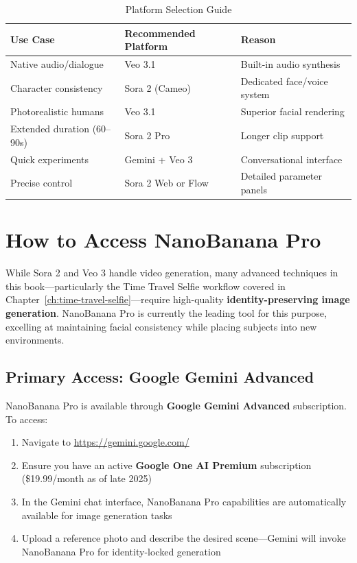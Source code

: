 \begin{table}[H]
\centering
\caption{Platform Selection Guide}
\label{tab:veo-sora-selection}
\begin{tabular}{p{4cm}p{5cm}p{5cm}}
\toprule
\textbf{Use Case} & \textbf{Recommended Platform} & \textbf{Reason} \\
\midrule
Native audio/dialogue & Veo 3.1 & Built-in audio synthesis \\
Character consistency & Sora 2 (Cameo) & Dedicated face/voice system \\
Photorealistic humans & Veo 3.1 & Superior facial rendering \\
Extended duration (60--90s) & Sora 2 Pro & Longer clip support \\
Quick experiments & Gemini + Veo 3 & Conversational interface \\
Precise control & Sora 2 Web or Flow & Detailed parameter panels \\
\bottomrule
\end{tabular}
\end{table}

\section{How to Access NanoBanana Pro}
\label{sec:accessing-nanobanana}

While Sora 2 and Veo 3 handle video generation, many advanced techniques in this book—particularly the Time Travel Selfie workflow covered in Chapter~\ref{ch:time-travel-selfie}—require high-quality \textbf{identity-preserving image generation}. NanoBanana Pro is currently the leading tool for this purpose, excelling at maintaining facial consistency while placing subjects into new environments.

\subsection{Primary Access: Google Gemini Advanced}

NanoBanana Pro is available through \textbf{Google Gemini Advanced} subscription. To access:

\begin{enumerate}
\item Navigate to \url{https://gemini.google.com/}
\item Ensure you have an active \textbf{Google One AI Premium} subscription (\$19.99/month as of late 2025)
\item In the Gemini chat interface, NanoBanana Pro capabilities are automatically available for image generation tasks
\item Upload a reference photo and describe the desired scene—Gemini will invoke NanoBanana Pro for identity-locked generation
\end{enumerate}

